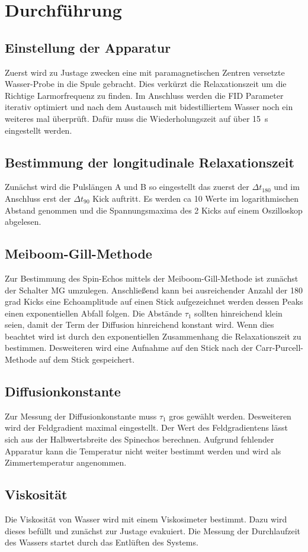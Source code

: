\section{Durchführung}%
\label{sec:durchfuehrung}

\subsection{Einstellung der Apparatur}%
\label{sub:einstellung_der_apparatur}

Zuerst wird zu Justage zwecken eine mit paramagnetischen Zentren versetzte
Wasser-Probe in die Spule gebracht.
Dies verkürzt die Relaxationszeit um die Richtige Larmorfrequenz zu finden. 
Im Anschluss werden die FID Parameter iterativ optimiert und nach dem Austausch
mit bidestilliertem Wasser noch ein weiteres mal überprüft. 
Dafür muss die Wiederholungszeit auf über \SI{15}{\second} eingestellt werden.

\subsection{Bestimmung der longitudinale Relaxationszeit}%
\label{sub:bestimmung_der_longitudinale_relaxationszeit}
Zunächst wird die Pulslängen A und B so eingestellt das zuerst der 
$\Delta t_{180}$ und im Anschluss erst der $\Delta t_{90}$ Kick auftritt. 
Es werden ca 10 Werte im logarithmischen Abstand genommen und die
Spannungsmaxima des 2 Kicks auf einem Oszilloskop abgelesen.

\subsection{Meiboom-Gill-Methode}%
\label{sub:meiboom_gill_methode}
Zur Bestimmung des Spin-Echos mittels der Meiboom-Gill-Methode ist zunächst der
Schalter MG umzulegen. Anschließend kann bei ausreichender Anzahl der 180 grad
Kicks eine Echoamplitude auf einen Stick aufgezeichnet werden dessen Peaks einen
exponentiellen Abfall folgen. 
Die Abstände $\tau_1$ sollten hinreichend klein seien, damit der Term der
Diffusion hinreichend konstant wird.
Wenn dies beachtet wird ist durch den exponentiellen Zusammenhang die
Relaxationszeit zu bestimmen. 
Desweiteren wird eine Aufnahme auf den Stick nach der Carr-Purcell-Methode auf
dem Stick gespeichert.

\subsection{Diffusionkonstante}%
\label{sub:diffusionskonstante}
Zur Messung der Diffusionkonstante muss $\tau_1$ gros gewählt werden. 
Desweiteren wird der Feldgradient maximal eingestellt.
Der Wert des Feldgradientens lässt sich aus der Halbwertsbreite des Spinechos
berechnen.
Aufgrund fehlender Apparatur kann die Temperatur nicht weiter bestimmt werden
und wird als Zimmertemperatur angenommen. 

\subsection{Viskosität}
Die Viskosität von Wasser wird mit einem Viskosimeter bestimmt. Dazu wird
dieses befüllt und zunächst zur Justage evakuiert.
Die Messung der Durchlaufzeit des Wassers startet durch das Entlüften des
Systems. 

